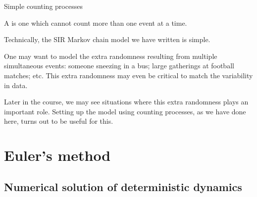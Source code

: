 %
%

\begin{frame}{Simple counting processes}
  \bi
\item A  is one which cannot count more than one event at a time.
\item Technically, the SIR Markov chain model we have written is simple.
\item One may want to model the extra randomness resulting from multiple simultaneous events:
  someone sneezing in a bus; large gatherings at football matches; etc.
  This extra randomness may even be critical to match the variability in data. 
\item Later in the course, we may see situations where this extra randomness plays an important role.
  Setting up the model using counting processes, as we have done here, turns out to be useful for this.
  \ei
\end{frame}

\section{Euler's method}

\subsection{Numerical solution of deterministic dynamics}

